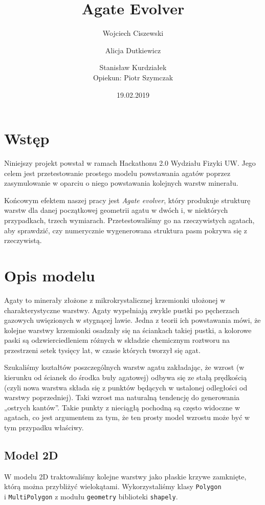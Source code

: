 \documentclass{article}
\title{Agate Evolver}
\author{Wojciech Ciszewski \and Alicja Dutkiewicz \and Stanisław Kurdziałek \\[1cm]{Opiekun: Piotr Szymczak}}
\date{19.02.2019}
\begin{document}
\maketitle
\section{Wstęp}
Niniejszy projekt powstał w ramach Hackathonu 2.0 Wydziału Fizyki UW. Jego celem jest przetestowanie prostego modelu powstawania agatów poprzez zasymulowanie w oparciu o niego powstawania kolejnych warstw minerału.

Końcowym efektem naszej pracy jest \textit{Agate evolver}, który produkuje strukturę warstw dla danej początkowej geometrii agatu w dwóch i, w niektórych przypadkach, trzech wymiarach. Przetestowaliśmy go na rzeczywistych agatach, aby sprawdzić, czy numerycznie wygenerowana struktura pasm pokrywa się z rzeczywistą.


\section{Opis modelu}
Agaty to minerały złożone z mikrokrystalicznej krzemionki ułożonej w charakterystyczne warstwy. Agaty wypełniają zwykle pustki po pęcherzach gazowych uwięzionych w stygnącej lawie. Jedna z teorii ich powstawania mówi, że kolejne warstwy krzemionki osadzały się na ściankach takiej pustki, a kolorowe paski są odzwierciedleniem różnych w składzie chemicznym roztworu na przestrzeni setek tysięcy lat, w czasie których tworzył się agat.

Szukaliśmy kształtów poszczególnych warstw agatu zakładając, że wzrost (w kierunku od ścianek do środka buły agatowej) odbywa się ze stałą prędkością (czyli nowa warstwa składa się z punktów będących w ustalonej odległości od warstwy poprzedniej). Taki wzrost ma naturalną tendencję do generowania „ostrych kantów”. Takie punkty z nieciągłą pochodną są często widoczne w agatach, co jest argumentem za tym, że ten prosty model wzrostu może być w tym przypadku właściwy.

\subsection{Model 2D}
W modelu 2D traktowaliśmy kolejne warstwy jako płaskie krzywe zamknięte, którą można przybliżyć wielokątami. Wykorzystaliśmy klasy \texttt{Polygon}\\
i \texttt{MultiPolygon} z modułu \texttt{geometry} biblioteki \texttt{shapely}.
\end{document}
